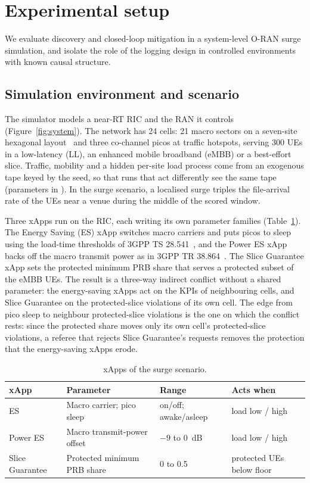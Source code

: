 \section{Experimental setup}
\label{sec:design}

We evaluate discovery and closed-loop mitigation in a system-level O-RAN surge simulation, and isolate the role of
the logging design in controlled environments with known causal structure.

\subsection{Simulation environment and scenario}
\label{sec:scenario}

The simulator models a near-RT RIC and the RAN it controls (Figure~\ref{fig:system}). The network has 24 cells: 21
macro sectors on a seven-site hexagonal layout~\cite{3gpp36814} and three co-channel picos at traffic hotspots, serving
300 UEs in a low-latency (LL), an enhanced mobile broadband (eMBB) or a best-effort slice. Traffic, mobility and a
hidden per-site load process come from an exogenous tape keyed by the seed, so that runs that act differently see the
same tape (parameters in ). In the surge scenario, a localised surge triples the file-arrival rate of the UEs
near a venue during the middle of the scored window.

Three xApps run on the RIC, each writing its own parameter families (Table~\ref{tab:xapps}). The Energy Saving (ES)
xApp switches macro carriers and puts picos to sleep using the load-time thresholds of 3GPP TS 28.541~\cite{3gpp28541},
and the Power ES xApp backs off the macro transmit power as in 3GPP TR 38.864~\cite{3gpp38864}. The Slice Guarantee
xApp sets the protected minimum PRB share that serves a protected subset of the eMBB UEs. The result is a three-way
indirect conflict without a shared parameter: the energy-saving xApps act on the KPIs of neighbouring cells, and Slice
Guarantee on the protected-slice violations of its own cell. The edge from pico sleep to neighbour protected-slice
violations is the one on which the conflict rests: since the protected share moves only its own cell's protected-slice
violations, a referee that rejects Slice Guarantee's requests removes the protection that the energy-saving xApps
erode.

\begin{table}[tbp]
\caption{xApps of the surge scenario.}
\label{tab:xapps}
\setlength{\tabcolsep}{4pt}
\begin{tabular}{@{}p{2.2cm} p{3.5cm} p{3.0cm} p{3.5cm}@{}}
\toprule
xApp & Parameter & Range & Acts when \tabularnewline
\midrule
\raggedright ES & \raggedright Macro carrier; pico sleep & \raggedright on/off; awake/asleep & \raggedright load low / high \tabularnewline
\raggedright Power ES & \raggedright Macro transmit-power offset & \raggedright $-9$ to 0~dB & \raggedright load low / high \tabularnewline
\raggedright Slice Guarantee & \raggedright Protected minimum PRB share & \raggedright 0 to 0.5 & \raggedright protected UEs below floor \tabularnewline
\bottomrule
\end{tabular}
\end{table}

